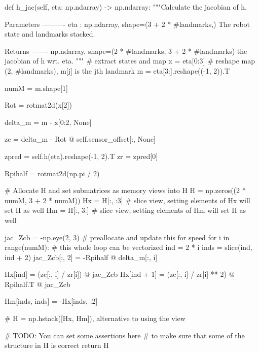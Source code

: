 \begin{pythoncode}
def h_jac(self, eta: np.ndarray) -> np.ndarray:
    """Calculate the jacobian of h.

    Parameters
    ----------
    eta : np.ndarray, shape=(3 + 2 * #landmarks,)
    The robot state and landmarks stacked.

    Returns
    -------
    np.ndarray, shape=(2 * #landmarks, 3 + 2 * #landmarks)
    the jacobian of h wrt. eta.
    """
    # extract states and map
    x = eta[0:3]
    # reshape map (2, #landmarks), m[j] is the jth landmark
    m = eta[3:].reshape((-1, 2)).T

    numM = m.shape[1]

    Rot = rotmat2d(x[2])

    delta_m = m - x[0:2, None]

    zc = delta_m - Rot @ self.sensor_offset[:, None]

    zpred = self.h(eta).reshape(-1, 2).T
    zr = zpred[0]

    Rpihalf = rotmat2d(np.pi / 2)

    # Allocate H and set submatrices as memory views into H
    H = np.zeros((2 * numM, 3 + 2 * numM))
    Hx = H[:, :3]  # slice view, setting elements of Hx will set H as well
    Hm = H[:, 3:]  # slice view, setting elements of Hm will set H as well

    jac_Zcb = -np.eye(2, 3)  # preallocate and update this for speed
    for i in range(numM):  # this whole loop can be vectorized
        ind = 2 * i
        inds = slice(ind, ind + 2)
        jac_Zcb[:, 2] = -Rpihalf @ delta_m[:, i]

        Hx[ind] = (zc[:, i] / zr[i]) @ jac_Zcb
        Hx[ind + 1] = (zc[:, i] / zr[i] ** 2) @ Rpihalf.T @ jac_Zcb

        Hm[inds, inds] = -Hx[inds, :2]

    # H = np.hstack([Hx, Hm]), alternative to using the view

    # TODO: You can set some assertions here 
    # to make sure that some of the structure in H is correct
    return H
\end{pythoncode}